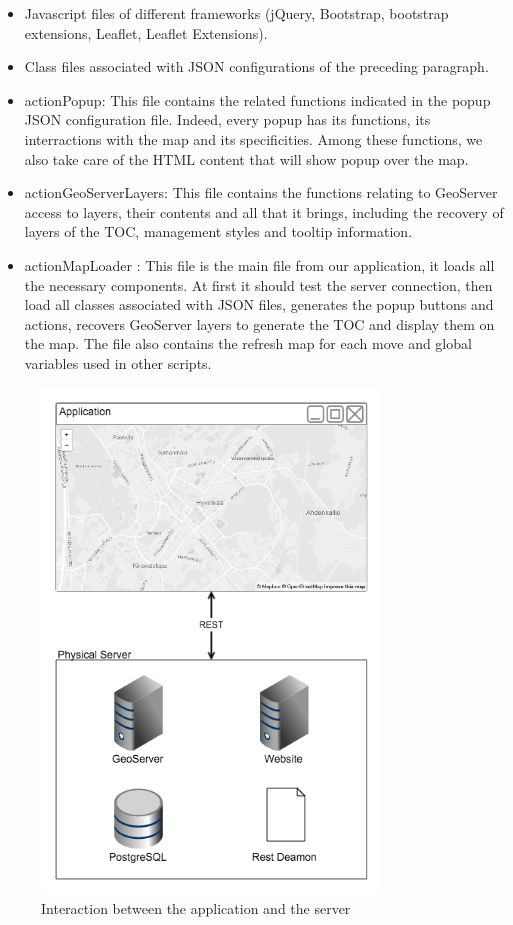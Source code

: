 \begin {itemize}
  \item Javascript files of different frameworks (jQuery, Bootstrap, bootstrap extensions, Leaflet, Leaflet Extensions).
  \item Class files associated with JSON configurations of the preceding paragraph.
  \item actionPopup: This file contains the related functions indicated in the popup JSON configuration file. Indeed, every popup has its functions, its interractions with the map and its specificities. Among these functions, we also take care of the HTML content that will show popup over the map.
  \item actionGeoServerLayers: This file contains the functions relating to GeoServer access to layers, their contents and all that it brings, including the recovery of layers of the TOC, management styles and tooltip information.
  \item actionMapLoader : This file is the main file from our application, it loads all the necessary components. At first it should test the server connection, then load all classes associated with JSON files, generates the popup buttons and actions, recovers GeoServer layers to generate the TOC and display them on the map. The file also contains the refresh map for each move and global variables used in other scripts.
\end {itemize}


\begin{figure}[ht]
  \centering
  \includegraphics[width=9cm]{img/c02-application/png/app-server-interact.png}
  \caption{Interaction between the application and the server}
\end{figure}








